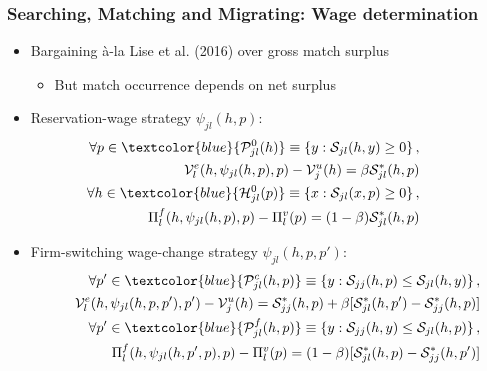 \documentclass{beamer}
\newcommand{\1}{\mathbb{1}}
\newcommand{\Vuj}{\mathcal{V}^u_{j}}
\newcommand{\Vel}{\mathcal{V}^e_{l}}
\newcommand{\Su}{\mathcal{S}}
\begin{document}
\begin{frame}\frametitle{Searching, Matching and Migrating: Wage determination}
\begin{itemize}
\item Bargaining \`{a}-la Lise et al. (2016) over gross match surplus
\begin{itemize}
\item But match occurrence depends on net surplus
\end{itemize}
\end{itemize}
\medskip

\begin{itemize}
\item Reservation-wage strategy $\psi_{jl}(h,p)$:
\footnotesize
\begin{eqnarray*}
&&\hspace{-1.5cm}\forall p\in\textcolor{blue}{\mathcal{P}^0_{jl}(h)}\equiv\left\{y:\Su_{jl}(h,y)\geq 0\right\},\\\hspace{0.3cm}&&\Vel(h,\psi_{jl}(h,p),p)-\Vuj(h) = \beta \Su^*_{jl}(h,p)\\
&&\hspace{-1.5cm}\forall h\in\textcolor{blue}{\mathcal{H}^0_{jl}(p)}\equiv\left\{x:\Su_{jl}(x,p)\geq 0\right\},\\\hspace{0.3cm}&&\Pi^f_l(h,\psi_{jl}(h,p),p)-\Pi^v_l(p) = (1-\beta) \Su^*_{jl}(h,p)
\end{eqnarray*}\normalsize

\medskip
\item Firm-switching wage-change strategy $\psi_{jl}(h,p,p')$:
\footnotesize
\begin{eqnarray*}
&&\hspace{-1.7cm}\forall p'\in\textcolor{blue}{\mathcal{P}^c_{jl}(h,p)}\equiv \left\{y:\Su_{jj}(h,p)\leq \Su_{jl}(h,y)\right\},\\
&&\Vel(h,\psi_{jl}(h,p,p'),p') - \Vuj(h) =  \Su^*_{jj}(h, p) + \beta[ \Su^*_{jl}(h, p')-\Su^*_{jj}(h, p)] \\
&&\hspace{-1.7cm}\forall p'\in \textcolor{blue}{\mathcal{P}^f_{jl}(h,p)}\equiv \left\{y:\Su_{jj}(h,y)\leq \Su_{jl}(h,p)\right\},\\
&&\Pi^f_l(h,\psi_{jl}(h,p',p),p) -\Pi^v_l(p) = (1-\beta) [\Su^*_{jl}(h, p)- \Su^*_{jj}(h, p')]
\end{eqnarray*}
\end{itemize}
\end{frame}
\end{document}
